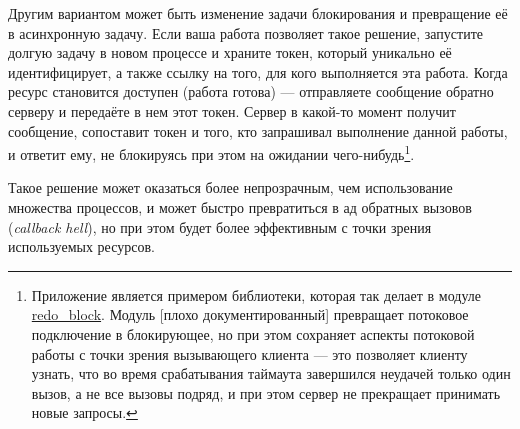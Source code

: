 Другим вариантом может быть изменение задачи блокирования и превращение её в асинхронную задачу. Если ваша работа позволяет такое решение, запустите долгую задачу в новом процессе и храните токен, который уникально её идентифицирует, а также ссылку на того, для кого выполняется эта работа. Когда ресурс становится доступен (работа готова) --- отправляете сообщение обратно серверу и передаёте в нем этот токен. Сервер в какой-то момент получит сообщение, сопоставит токен и того, кто запрашивал выполнение данной работы, и ответит ему, не блокируясь при этом на ожидании чего-нибудь\footnote{Приложение  является примером библиотеки, которая так делает в модуле \href{https://github.com/heroku/redo/blob/master/src/redo\_block.erl}{redo\_block}. Модуль [плохо документированный] превращает потоковое подключение в блокирующее, но при этом сохраняет аспекты потоковой работы с точки зрения вызывающего клиента --- это позволяет клиенту узнать, что во время срабатывания таймаута завершился неудачей только один вызов, а не все вызовы подряд, и при этом сервер не прекращает принимать новые запросы.}.

Такое решение может оказаться более непрозрачным, чем использование множества процессов, и может быстро превратиться в ад обратных вызовов (\emph{callback hell}), но при этом будет более эффективным с точки зрения используемых ресурсов.


